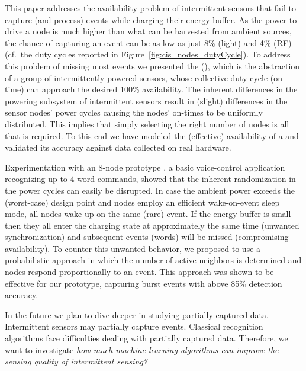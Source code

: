 This paper addresses the availability problem of intermittent sensors
that fail to capture (and process) events while charging their energy
buffer.  As the power to drive a node is much higher than what can be
harvested from ambient sources, the chance of capturing an event can
be as low as just 8\% (light) and 4\% (RF) (cf.\ the duty cycles
reported in Figure~\ref{fig:cis_nodes_dutyCycle}). To address this problem of missing
most events we presented the \fullcis (\cis),
which is the abstraction of a group of intermittently-powered sensors,
whose collective duty cycle (on-time) can approach the desired 100\%
availability.  The inherent differences in the powering subsystem of
intermittent sensors result in (slight) differences in the sensor nodes'
power cycles causing the nodes' on-times to be uniformly distributed. This
implies that simply selecting the right number of nodes is all that
is required. To this end we have modeled the (effective) availability
of a \cis and validated its accuracy against data collected on real
hardware.

Experimentation with an 8-node prototype \cis, a basic voice-control
application recognizing up to 4-word commands, showed that the inherent
randomization in the power cycles can easily be disrupted. In case the
ambient power exceeds the (worst-case) design point and nodes employ an
efficient wake-on-event sleep mode, all nodes wake-up on the same (rare)
event. If the energy buffer is small then they all enter the charging
state at approximately the same time (unwanted synchronization) and
subsequent events (words) will be missed (compromising availability).
To counter this unwanted behavior, we proposed to use a probabilistic
approach in which the number of active neighbors is determined and nodes
respond proportionally to an event. This approach was shown to be effective
for our prototype, capturing burst events with above 85\% detection accuracy.

In the future we plan to dive deeper in studying partially captured data. 
Intermittent sensors may partially capture events. Classical recognition 
algorithms face difficulties dealing with partially captured data. 
Therefore, we want to investigate \emph{how much machine learning algorithms 
can improve the sensing quality of intermittent sensing?} 


